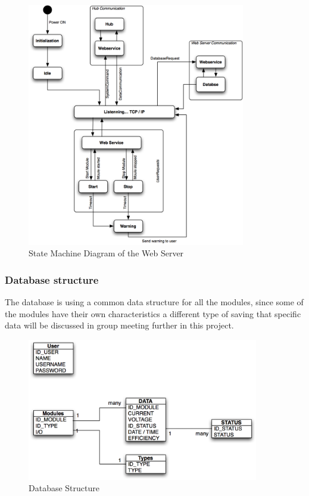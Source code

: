 	\begin{figure}[H]
		\begin{centering}
			 \includegraphics[width=0.85\textwidth]{images/state_web.png}
		\caption{State Machine Diagram of the Web Server}
	 	\end{centering}
	\end{figure}
	
\subsubsection{Database structure}

The database is using a common data structure for all the modules, since some of the modules have their own characteristics a different type of saving that specific data will be discussed in group meeting further in this project. 

	\begin{figure}[H]
		\begin{centering}
			 \includegraphics[width=0.9\textwidth]{images/db_prop.png}
		\caption{Database Structure}
	 	\end{centering}
	\end{figure}


